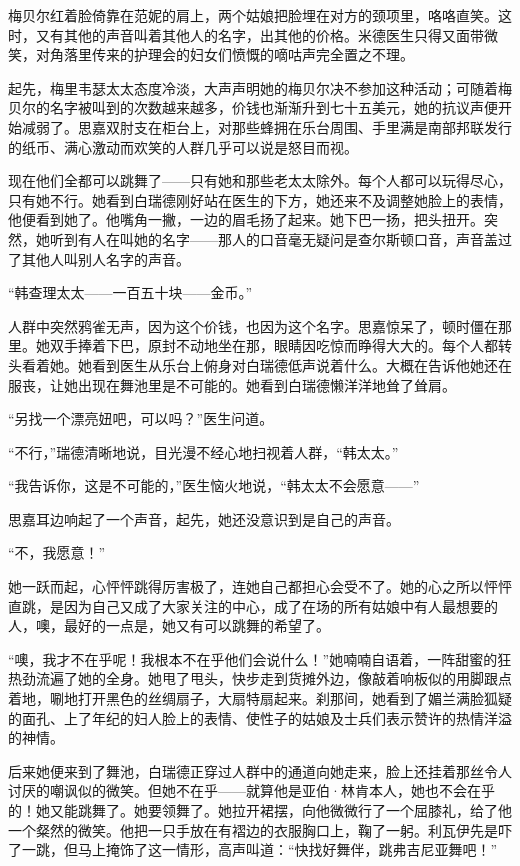 \par 梅贝尔红着脸倚靠在范妮的肩上，两个姑娘把脸埋在对方的颈项里，咯咯直笑。这时，又有其他的声音叫着其他人的名字，出其他的价格。米德医生只得又面带微笑，对角落里传来的护理会的妇女们愤慨的嘀咕声完全置之不理。
\par 起先，梅里韦瑟太太态度冷淡，大声声明她的梅贝尔决不参加这种活动；可随着梅贝尔的名字被叫到的次数越来越多，价钱也渐渐升到七十五美元，她的抗议声便开始减弱了。思嘉双肘支在柜台上，对那些蜂拥在乐台周围、手里满是南部邦联发行的纸币、满心激动而欢笑的人群几乎可以说是怒目而视。
\par 现在他们全都可以跳舞了——只有她和那些老太太除外。每个人都可以玩得尽心，只有她不行。她看到白瑞德刚好站在医生的下方，她还来不及调整她脸上的表情，他便看到她了。他嘴角一撇，一边的眉毛扬了起来。她下巴一扬，把头扭开。突然，她听到有人在叫她的名字——那人的口音毫无疑问是查尔斯顿口音，声音盖过了其他人叫别人名字的声音。
\par “韩查理太太——一百五十块——金币。”
\par 人群中突然鸦雀无声，因为这个价钱，也因为这个名字。思嘉惊呆了，顿时僵在那里。她双手捧着下巴，原封不动地坐在那，眼睛因吃惊而睁得大大的。每个人都转头看着她。她看到医生从乐台上俯身对白瑞德低声说着什么。大概在告诉他她还在服丧，让她出现在舞池里是不可能的。她看到白瑞德懒洋洋地耸了耸肩。
\par “另找一个漂亮妞吧，可以吗？”医生问道。
\par “不行，”瑞德清晰地说，目光漫不经心地扫视着人群，“韩太太。”
\par “我告诉你，这是不可能的，”医生恼火地说，“韩太太不会愿意——”
\par 思嘉耳边响起了一个声音，起先，她还没意识到是自己的声音。
\par “不，我愿意！”
\par 她一跃而起，心怦怦跳得厉害极了，连她自己都担心会受不了。她的心之所以怦怦直跳，是因为自己又成了大家关注的中心，成了在场的所有姑娘中有人最想要的人，噢，最好的一点是，她又有可以跳舞的希望了。
\par “噢，我才不在乎呢！我根本不在乎他们会说什么！”她喃喃自语着，一阵甜蜜的狂热劲流遍了她的全身。她甩了甩头，快步走到货摊外边，像敲着响板似的用脚跟点着地，唰地打开黑色的丝绸扇子，大扇特扇起来。刹那间，她看到了媚兰满脸狐疑的面孔、上了年纪的妇人脸上的表情、使性子的姑娘及士兵们表示赞许的热情洋溢的神情。
\par 后来她便来到了舞池，白瑞德正穿过人群中的通道向她走来，脸上还挂着那丝令人讨厌的嘲讽似的微笑。但她不在乎——就算他是亚伯·林肯本人，她也不会在乎的！她又能跳舞了。她要领舞了。她拉开裙摆，向他微微行了一个屈膝礼，给了他一个粲然的微笑。他把一只手放在有褶边的衣服胸口上，鞠了一躬。利瓦伊先是吓了一跳，但马上掩饰了这一情形，高声叫道：“快找好舞伴，跳弗吉尼亚舞吧！”
